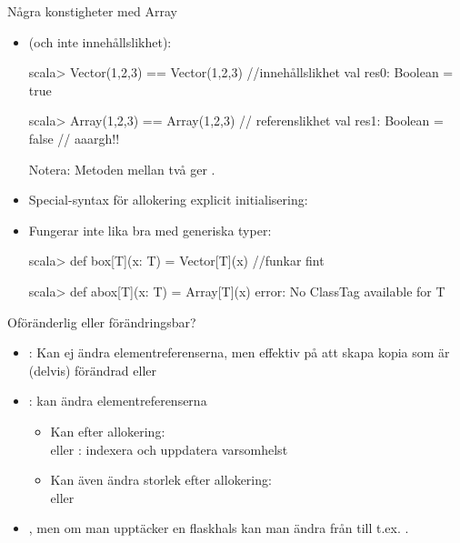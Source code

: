 \begin{Slide}{Några konstigheter med Array}
\begin{itemize}\SlideFontSmall
\item {} (och inte innehållslikhet): 
\begin{REPLnonum}
scala> Vector(1,2,3) == Vector(1,2,3) //innehållslikhet
val res0: Boolean = true

scala> Array(1,2,3) == Array(1,2,3) // referenslikhet
val res1: Boolean = false  // aaargh!!
\end{REPLnonum}
Notera: Metoden \code{==} mellan två  ger .
\item Special-syntax för allokering  explicit initialisering: \\
{\SlideFontSmall{}}
\item Fungerar inte lika bra med generiska typer:
\begin{REPLnonum}
scala> def box[T](x: T) = Vector[T](x)  //funkar fint

scala> def abox[T](x: T) = Array[T](x)
  error: No ClassTag available for T
\end{REPLnonum}
\end{itemize}
\end{Slide}

\begin{Slide}{Oföränderlig eller förändringsbar?}
\begin{itemize}
\item {}:  Kan ej ändra elementreferenserna, men effektiv på att skapa kopia som är (delvis) förändrad  eller 

\item {}: kan ändra elementreferenserna
  \begin{itemize}
  \item Kan  efter allokering: \\  eller : indexera och uppdatera varsomhelst
  \item Kan även ändra storlek efter allokering:
  \\ eller 
  \end{itemize}
\item {}, men om man  upptäcker en flaskhals kan man ändra från  till t.ex. .
\end{itemize}
\end{Slide}



